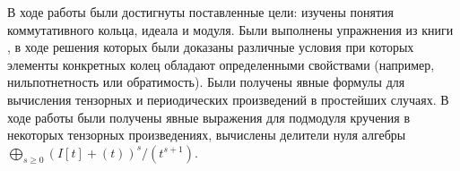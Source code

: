В ходе работы были достигнуты поставленные цели: изучены понятия коммутативного кольца, идеала и модуля. Были выполнены упражнения из
книги \cite{A-M}, в ходе решения которых были доказаны различные условия при которых элементы конкретных колец 
обладают определенными свойствами (например, нильпотнетность или обратимость). 
Были получены явные формулы для вычисления тензорных и периодических произведений в простейших случаях.
В ходе работы были получены явные выражения для подмодуля кручения в некоторых тензорных произведениях,
вычислены делители нуля алгебры $\bigoplus_{s \geq 0}{(I[t] + (t))^s / (t^{s + 1})}$.